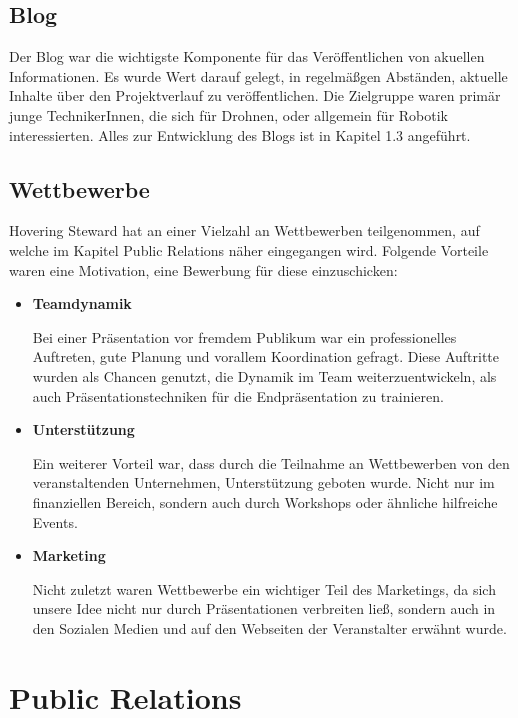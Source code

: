     \subsection*{Blog}
    Der Blog war die wichtigste Komponente für das Veröffentlichen von akuellen Informationen. Es wurde Wert darauf gelegt,
    in regelmäßgen Abständen, aktuelle Inhalte über den Projektverlauf zu veröffentlichen. Die Zielgruppe waren primär junge TechnikerInnen,
    die sich für Drohnen, oder allgemein für Robotik interessierten. Alles zur Entwicklung des Blogs ist in Kapitel 1.3 angeführt.

    \subsection*{Wettbewerbe}
    Hovering Steward hat an einer Vielzahl an Wettbewerben teilgenommen, auf welche im Kapitel Public Relations näher eingegangen wird.
    Folgende Vorteile waren eine Motivation, eine Bewerbung für diese einzuschicken:

    \begin{itemize}
      \item \textbf{Teamdynamik}

      Bei einer Präsentation vor fremdem Publikum war ein professionelles Auftreten, gute Planung und vorallem Koordination gefragt.
      Diese Auftritte wurden als Chancen genutzt, die Dynamik im Team weiterzuentwickeln, als auch Präsentationstechniken für
      die Endpräsentation zu trainieren.

      \item \textbf{Unterstützung}

      Ein weiterer Vorteil war, dass durch die Teilnahme an Wettbewerben von den veranstaltenden Unternehmen, Unterstützung geboten wurde. Nicht nur im finanziellen
      Bereich, sondern auch durch Workshops oder ähnliche hilfreiche Events.

      \item \textbf{Marketing}

      Nicht zuletzt waren Wettbewerbe ein wichtiger Teil des Marketings, da sich unsere Idee nicht nur durch Präsentationen verbreiten ließ,
      sondern auch in den Sozialen Medien und auf den Webseiten der Veranstalter erwähnt wurde.

    \end{itemize}


\section{Public Relations}

